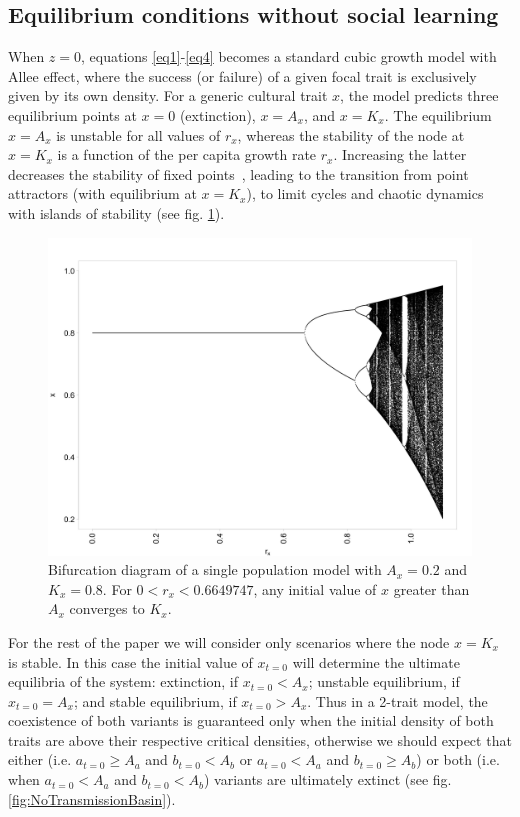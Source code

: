 \documentclass[review,authoryear]{elsarticle}
\begin{document}
\subsection{Equilibrium conditions without social learning}

When $z=0$, equations \ref{eq1}-\ref{eq4} becomes a standard cubic growth model with Allee effect, where the success (or failure) of a given focal trait is exclusively given by its own density. For a generic cultural trait $x$, the model predicts three equilibrium points at $x=0$ (extinction), $x=A_x$, and $x=K_x$. The equilibrium $x=A_x$ is unstable for all values of $r_x$, whereas the stability of the node at $x=K_x$ is a function of the per capita growth rate $r_x$. Increasing the latter decreases the stability of fixed points~\citep{scheuring_1999}, leading to the transition from point attractors (with equilibrium at $x=K_x$), to limit cycles and chaotic dynamics with islands of stability (see fig. \ref{fig:bifurcationDiagram}). 

\begin{figure}[h!]
  \centering
      \includegraphics[width=1\textwidth]{./figures/figure1.jpg}
  \caption{Bifurcation diagram of a single population model with $A_x=0.2$ and $K_x=0.8$. For $0<r_x<0.6649747$, any initial value of $x$ greater than $A_x$ converges to $K_x$.}
    \label{fig:bifurcationDiagram}
\end{figure}

For the rest of the paper we will consider only scenarios where the node $x=K_x$ is stable. In this case the initial value of $x_{t=0}$ will determine the ultimate equilibria of the system: extinction, if $x_{t=0}<A_x$; unstable equilibrium, if $x_{t=0}=A_x$; and stable equilibrium, if $x_{t=0}>A_x$. Thus in a 2-trait model, the coexistence of both variants is guaranteed only when the initial density of both traits are above their respective critical densities, otherwise we should expect that either (i.e. $a_{t=0} \geq A_a$ and $b_{t=0}<A_b$ or $a_{t=0}<A_a$ and $b_{t=0} \geq A_b$) or both (i.e. when $a_{t=0}<A_a$ and $b_{t=0}<A_b$) variants are ultimately extinct (see fig. \ref{fig:NoTransmissionBasin}). 
\end{document}
